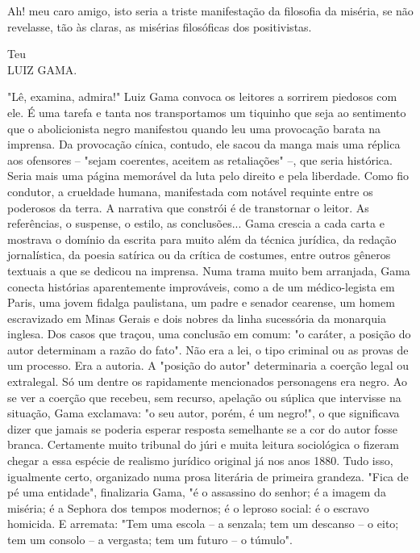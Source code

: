 Ah! meu caro amigo, isto seria a triste manifestação da filosofia da
miséria, se não revelasse, tão às claras, as misérias filosóficas dos
positivistas.

Teu\\
LUIZ GAMA.

\pagebreak
\mbox{}\vfill
\thispagestyle{empty}

{\small\noindent
"Lê, examina, admira!" Luiz Gama convoca os leitores a sorrirem
piedosos com ele. É uma tarefa e tanta nos transportamos um tiquinho que
seja ao sentimento que o abolicionista negro manifestou quando leu uma
provocação barata na imprensa. Da provocação cínica, contudo, ele sacou
da manga mais uma réplica aos ofensores -- "sejam coerentes, aceitem as
retaliações" --, que seria histórica. Seria mais uma página memorável da
luta pelo direito e pela liberdade. Como fio condutor, a crueldade
humana, manifestada com notável requinte entre os poderosos da terra. A
narrativa que constrói é de transtornar o leitor. As referências, o
suspense, o estilo, as conclusões... Gama crescia a cada carta e
mostrava o domínio da escrita para muito além da técnica jurídica, da
redação jornalística, da poesia satírica ou da crítica de costumes,
entre outros gêneros textuais a que se dedicou na imprensa. Numa trama
muito bem arranjada, Gama conecta histórias aparentemente improváveis,
como a de um médico-legista em Paris, uma jovem fidalga paulistana, um
padre e senador cearense, um homem escravizado em Minas Gerais e dois
nobres da linha sucessória da monarquia inglesa. Dos casos que traçou,
uma conclusão em comum: "o caráter, a posição do autor determinam a
razão do fato". Não era a lei, o tipo criminal ou as provas de um
processo. Era a autoria. A "posição do autor" determinaria a coerção
legal ou extralegal. Só um dentre os rapidamente mencionados personagens
era negro. Ao se ver a coerção que recebeu, sem recurso, apelação ou
súplica que intervisse na situação, Gama exclamava: "o seu autor, porém,
é um negro!", o que significava dizer que jamais se poderia esperar
resposta semelhante se a cor do autor fosse branca. Certamente muito
tribunal do júri e muita leitura sociológica o fizeram chegar a essa
espécie de realismo jurídico original já nos anos 1880. Tudo isso,
igualmente certo, organizado numa prosa literária de primeira grandeza.
"Fica de pé uma entidade", finalizaria Gama, "é o assassino do senhor; é
a imagem da miséria; é a Sephora dos tempos modernos; é o leproso
social: é o escravo homicida. E arremata: "Tem uma escola -- a senzala;
tem um descanso -- o eito; tem um consolo -- a vergasta; tem um futuro
-- o túmulo". }

